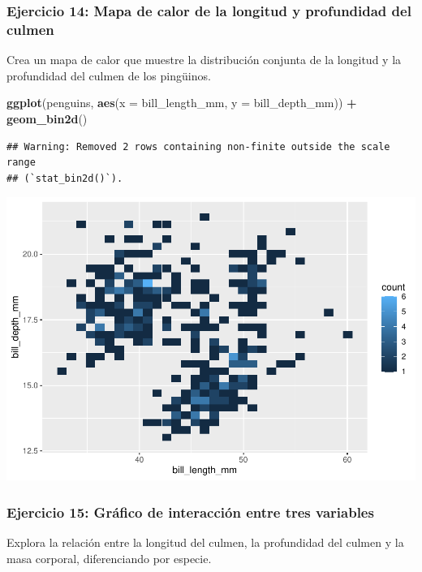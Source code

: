 \documentclass[
]{book}
\newenvironment{Shaded}{\begin{snugshade}}{\end{snugshade}}
\newcommand{\AttributeTok}[1]{\textcolor[rgb]{0.13,0.29,0.53}{#1}}
\newcommand{\FunctionTok}[1]{\textcolor[rgb]{0.13,0.29,0.53}{\textbf{#1}}}
\newcommand{\NormalTok}[1]{#1}
\newcommand{\SpecialCharTok}[1]{\textcolor[rgb]{0.81,0.36,0.00}{\textbf{#1}}}
\begin{document}
\subsubsection{Ejercicio 14: Mapa de calor de la longitud y profundidad del culmen}\label{ejercicio-14-mapa-de-calor-de-la-longitud-y-profundidad-del-culmen}

Crea un mapa de calor que muestre la distribución conjunta de la longitud y la profundidad del culmen de los pingüinos.

\begin{Shaded}
\begin{Highlighting}[]
\FunctionTok{ggplot}\NormalTok{(penguins, }\FunctionTok{aes}\NormalTok{(}\AttributeTok{x =}\NormalTok{ bill\_length\_mm, }\AttributeTok{y =}\NormalTok{ bill\_depth\_mm)) }\SpecialCharTok{+}
  \FunctionTok{geom\_bin2d}\NormalTok{()}
\end{Highlighting}
\end{Shaded}

\begin{verbatim}
## Warning: Removed 2 rows containing non-finite outside the scale range
## (`stat_bin2d()`).
\end{verbatim}

\includegraphics{bookdown-demo_files/figure-latex/unnamed-chunk-196-1.pdf}

\subsubsection{Ejercicio 15: Gráfico de interacción entre tres variables}\label{ejercicio-15-gruxe1fico-de-interacciuxf3n-entre-tres-variables}

Explora la relación entre la longitud del culmen, la profundidad del culmen y la masa corporal, diferenciando por especie.
\end{document}
